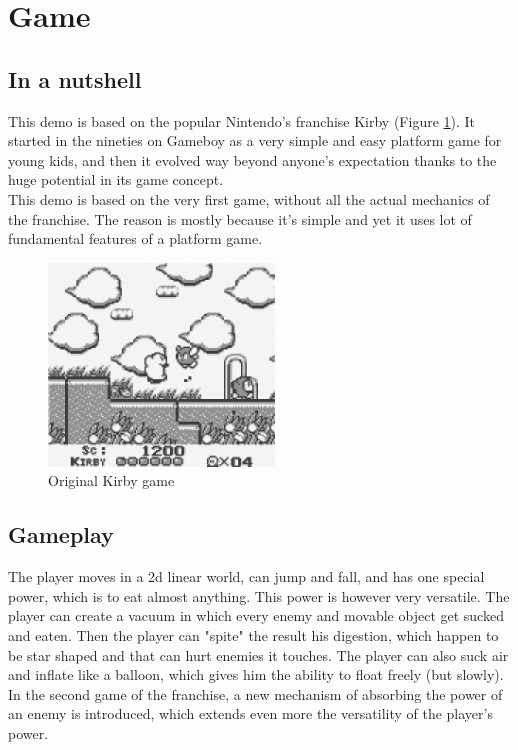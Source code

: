 \documentclass[10pt,a4paper]{article}
\begin{document}
\section{Game}

\subsection{In a nutshell}
This demo is based on the popular Nintendo's\cite{nintendo} franchise Kirby\cite{kirby} (Figure \ref{fig:original_game}). It started in the nineties on Gameboy as a very simple and easy platform game for young kids, and then it evolved way beyond anyone's expectation thanks to the huge potential in its game concept. \\
This demo is based on the very first game, without all the actual mechanics of the franchise. The reason is mostly because it's simple and yet it uses lot of fundamental features of a platform game.

\begin{figure}
\centering
\includegraphics[bb=0 0 480 432,width=6cm]{KDL4.png} 
\caption{Original Kirby game}
\label{fig:original_game}
\end{figure}

\subsection{Gameplay}
The player moves in a 2d linear world, can jump and fall, and has one special power, which is to eat almost anything. This power is however very versatile. The player can create a vacuum in which every enemy and movable object get sucked and eaten. Then the player can "spite" the result his digestion, which happen to be star shaped and that can hurt enemies it touches. The player can also suck air and inflate like a balloon, which gives him the ability to float freely (but slowly). In the second game of the franchise, a new mechanism of absorbing the power of an enemy is introduced, which extends even more the versatility of the player's power.
\end{document}

